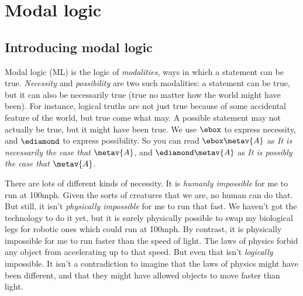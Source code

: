 
\part{Modal logic}
\label{ch.ML}

%

\chapter{Introducing modal logic}
\label{Intro}

Modal logic (ML) is the logic of \emph{modalities}, ways in which a statement can be true. \emph{Necessity} and \emph{possibility} are two such modalities: a statement can be true, but it can also be necessarily true (true no matter how the world might have been). For instance, logical truths are not just true because of some accidental feature of the world, but true come what may. A possible statement may not actually be true, but it might have been true. We use $\ebox$ to express necessity, and $\ediamond$ to express possibility. So you can read $\ebox \metav{A}$ as \emph{It is necessarily the case that} $\metav{A}$, and $\ediamond \metav{A}$ as \emph{It is possibly the case that} $\metav{A}$.

There are lots of different kinds of necessity. It is \emph{humanly impossible} for me to run at 100mph. Given the sorts of creatures that we are, no human can do that. But still, it isn't \emph{physically impossible} for me to run that fast. We haven't got the technology to do it yet, but it is surely physically possible to swap my biological legs for robotic ones which could run at 100mph. By contrast, it is physically impossible for me to run faster than the speed of light. The laws of physics forbid any object from accelerating up to that speed. But even that isn't \emph{logically} impossible. It isn't a contradiction to imagine that the laws of physics might have been different, and that they might have allowed objects to move faster than light.

